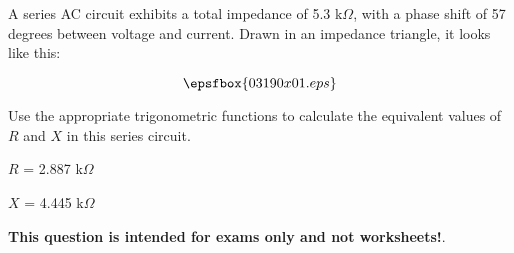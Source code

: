 

A series AC circuit exhibits a total impedance of 5.3 k$\Omega$, with a phase shift of 57 degrees between voltage and current.  Drawn in an impedance triangle, it looks like this:

$$\epsfbox{03190x01.eps}$$

Use the appropriate trigonometric functions to calculate the equivalent values of $R$ and $X$ in this series circuit.







$R$ = 2.887 k$\Omega$

$X$ = 4.445 k$\Omega$







{\bf This question is intended for exams only and not worksheets!}.




